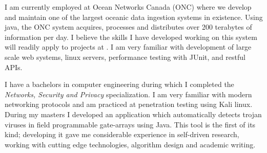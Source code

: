 I am currently employed at Ocean Networks Canada (ONC) where we develop and maintain one of the largest oceanic data ingestion systems in existence.
Using java, the ONC system acquires, processes and distributes over 200 terabytes of information per day.
I believe the skills I have developed working on this system will readily apply to projects at \company.
I am very familiar with development of large scale web systems, linux servers, performance testing with JUnit, and restful APIs.

I have a bachelors in computer engineering during which I completed the \textit{Networks, Security and Privacy} specialization.
I am very familiar with modern networking protocols and am practiced at penetration testing using Kali linux.
During my masters I developed an application which automatically detects trojan viruses in field programmable gate-arrays using Java. 
This tool is the first of its kind; developing it gave me considerable experience in self-driven research, working with cutting edge technologies, algorithm design and academic writing. 
